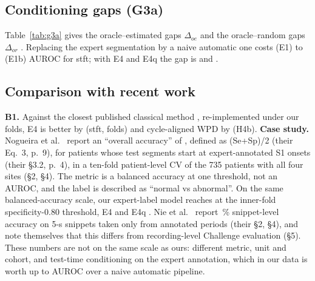 \documentclass[conference]{IEEEtran}
\begin{document}
\subsection{Conditioning gaps (G3a)}
Table~\ref{tab:g3a} gives the oracle--estimated gaps $\Delta_{oe}$ and the oracle--random gaps $\Delta_{or}$ \cite{cao2026}.
Replacing the expert segmentation by a naive automatic one costs  (E1) to
 (E1b) AUROC for stft; with E4 and E4q the gap is  and
.
\begin{table}[t]\centering\caption{Conditioning gaps (RF AUROC differences, 95\,\% CI).}\label{tab:g3a}
\resizebox{\linewidth}{!}{}\end{table}

\subsection{Comparison with recent work}\label{sec:case}
\textbf{B1.} Against the closest published classical method \cite{vimalajeewa2025}, re-implemented under our folds, E4 is
better by  (stft,  folds) and cycle-aligned WPD by  (H4b).
\textbf{Case study.} Nogueira et al.\ \cite{nogueira2026} report an ``overall accuracy'' of , defined
as (Se+Sp)/2 (their Eq.~3, p.~9), for patients whose test segments start at expert-annotated S1 onsets (their \S3.2, p.~4),
in a ten-fold patient-level CV of the 735 patients with all four sites (\S2, \S4). The metric is a balanced accuracy at one
threshold, not an AUROC, and the label is described as ``normal vs abnormal''. On the same balanced-accuracy scale, our
expert-label model reaches  at the inner-fold specificity-0.80 threshold, E4  and
E4q . Nie et al.\ \cite{nie2024} report \,\% snippet-level accuracy on 5-s snippets
taken only from annotated periods (their \S2, \S4), and note themselves that this differs from recording-level Challenge
evaluation (\S5). These numbers are not on the same scale as ours: different metric, unit and cohort, and test-time
conditioning on the expert annotation, which in our data is worth up to  AUROC over a naive automatic
pipeline.
\end{document}
